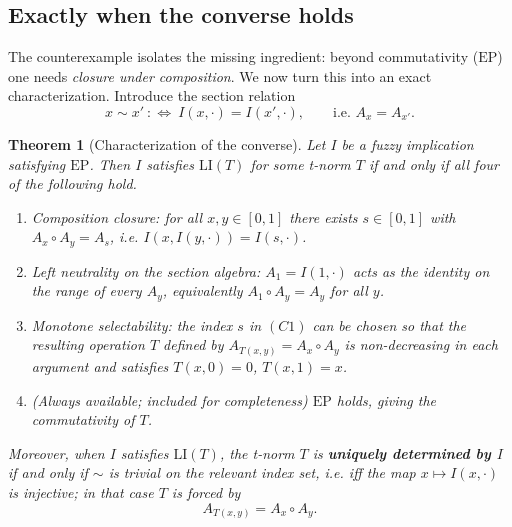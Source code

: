 \documentclass{amsart}
\newtheorem{theorem}{Theorem}
\theoremstyle{definition}
\theoremstyle{remark}
\newcommand{\zo}{[0,1]}
\newcommand{\LI}{\mathrm{LI}}
\newcommand{\EP}{\mathrm{EP}}
\newcommand{\Ax}{A}
\begin{document}
\subsection{Exactly when the converse holds}

The counterexample isolates the missing ingredient: beyond commutativity ($\EP$) one needs
\emph{closure under composition}. We now turn this into an exact characterization.
Introduce the section relation
\[
x\sim x'\ :\Longleftrightarrow\ I(x,\cdot)=I(x',\cdot),\qquad\text{i.e. }\Ax_x=\Ax_{x'} .
\]

\begin{theorem}[Characterization of the converse]\label{thm:b-char}
Let $I$ be a fuzzy implication satisfying $\EP$. Then $I$ satisfies $\LI(T)$ for some
t-norm $T$ if and only if all four of the following hold.
\begin{enumerate}
\item[(C1)] \emph{Composition closure:} for all $x,y\in\zo$ there exists $s\in\zo$ with
$\Ax_x\circ\Ax_y=\Ax_s$, i.e. $I(x,I(y,\cdot))=I(s,\cdot)$.
\item[(C2)] \emph{Left neutrality on the section algebra:} $\Ax_1=I(1,\cdot)$ acts as the
identity on the range of every $\Ax_y$, equivalently $\Ax_1\circ\Ax_y=\Ax_y$ for all $y$.
\item[(C3)] \emph{Monotone selectability:} the index $s$ in $(C1)$ can be chosen so that the
resulting operation $T$ defined by $\Ax_{T(x,y)}=\Ax_x\circ\Ax_y$ is non-decreasing in each
argument and satisfies $T(x,0)=0$, $T(x,1)=x$.
\item[(C4)] \emph{(Always available; included for completeness)} $\EP$ holds, giving the
commutativity of $T$.
\end{enumerate}
Moreover, when $I$ satisfies $\LI(T)$, the t-norm $T$ is \textbf{uniquely determined by $I$}
if and only if $\sim$ is trivial on the relevant index set, i.e. iff the map
$x\mapsto I(x,\cdot)$ is injective; in that case $T$ is forced by
\begin{equation}\label{eq:Tforced}
\Ax_{T(x,y)}=\Ax_x\circ\Ax_y .
\end{equation}
\end{theorem}
\end{document}
